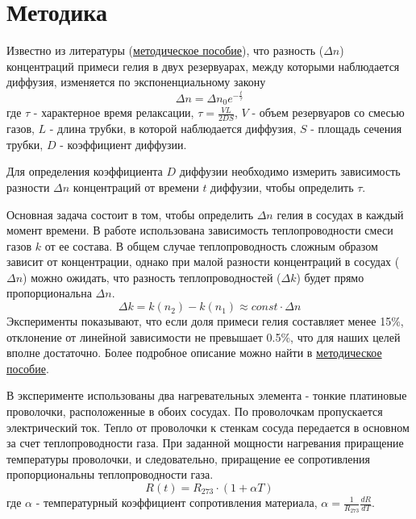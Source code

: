 \section{Методика}

Известно из литературы (\href{https://old.mipt.ru/education/chair/physics/S_II/lab/rabota221/221.pdf}{методическое пособие}), что разность ($\Delta n$) концентраций  примеси гелия в двух резервуарах, между которыми наблюдается диффузия, изменяется по экспоненциальному закону
\begin{equation}
     \Delta n = \Delta n_0 e^{-\frac{t}{\tau}} \label{eq:delta_n_t}
\end{equation}
где $\tau$ - характерное время релаксации, 
$\tau = \frac{VL}{2DS}$, $V$ - объем резервуаров со смесью газов, $L$ - длина трубки, в которой наблюдается диффузия, $S$ - площадь сечения трубки, $D$ - коэффициент диффузии.

Для определения коэффициента $D$ диффузии  необходимо измерить зависимость разности $\Delta n$ концентраций  от времени $t$ диффузии, чтобы определить $\tau$. 

Основная задача состоит в том, чтобы определить $\Delta n$ гелия в сосудах в каждый момент времени. В работе использована зависимость теплопроводности смеси газов $k$ от ее состава. В общем случае теплопроводность сложным образом зависит от концентрации, однако при малой разности концентраций в сосудах ($\Delta n$) можно ожидать, что разность теплопроводностей ($\Delta  k$) будет прямо пропорциональна $\Delta n$.
\begin{equation}
     \Delta k = k(n_2)-k(n_1) \approx const \cdot \Delta n \label{eq: Delta_k}
\end{equation}
Эксперименты показывают, что если доля примеси гелия составляет менее 15\%, отклонение от линейной зависимости не превышает 0.5\%, что для наших целей вполне достаточно. Более подробное описание можно найти в \href{https://old.mipt.ru/education/chair/physics/S_II/lab/rabota221/221.pdf}{методическое пособие}.


В эксперименте использованы два нагревательных элемента - тонкие платиновые проволочки, расположенные в обоих сосудах. По проволочкам пропускается электрический ток. Тепло от проволочки к стенкам сосуда передается в основном за счет теплопроводности газа. При заданной мощности нагревания приращение температуры проволочки, и следовательно, приращение ее сопротивления  пропорциональны теплопроводности газа.
\begin{equation}
     R(t)=R_{273}\cdot(1+\alpha T) \label{eq: R_t}
\end{equation}
где $\alpha$ - температурный коэффициент сопротивления материала,  $\alpha = \frac{1}{R_{273}}\frac{dR}{dT}$.

